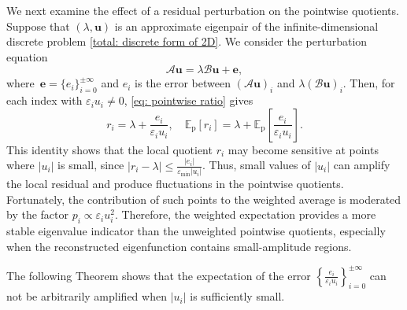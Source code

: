\documentclass[11pt]{article}
\numberwithin{equation}{section}
\begin{document}
We next examine the effect of a residual perturbation on the pointwise
quotients. Suppose that $(\lambda, \boldsymbol{u})$ is an approximate eigenpair of the infinite-dimensional discrete problem \eqref{total: discrete form of 2D}. We consider the perturbation equation
\begin{equation} \label{eq: error analysis}
\mathcal{A}\boldsymbol{u} = \lambda \mathcal{B}\boldsymbol{u} + \mathbf{e},
\end{equation}
where $\, \mathbf{e} = \{e_i\}_{i = 0}^{\pm \infty}$ and $e_i$ is the error between $(\mathcal{A}\boldsymbol{u})_i$ and $\lambda (\mathcal{B}\boldsymbol{u})_i$. Then, for each index with $\varepsilon_i u_i\neq0$, \eqref{eq: pointwise ratio} gives
\begin{equation} \label{eq: pointwise error term}
r_i = \lambda + \frac{e_i}{\varepsilon_i u_i},
\quad
\mathbb{E}_{\mathrm{p}}[r_i] = \lambda + \mathbb{E}_{\mathrm{p}}\left[\frac{e_i}{\varepsilon_i u_i}\right].
\end{equation}
This identity shows that the local quotient $r_i$ may become sensitive at points where $|u_i|$ is small, since $\left| r_i-\lambda \right| \leq \frac{|e_i|}{\varepsilon_{\min}|u_i|}$. Thus, small values of $|u_i|$ can amplify the local residual and produce fluctuations in the pointwise quotients. Fortunately, the contribution of such points to the weighted average is moderated by the factor $p_i\propto \varepsilon_i u_i^2$. Therefore, the weighted expectation provides a more stable eigenvalue indicator than the unweighted pointwise quotients, especially when the reconstructed eigenfunction contains small-amplitude regions.



The following Theorem shows that the expectation of the error $\left\{\frac{e_i}{\varepsilon_i u_i}\right\}_{i=0}^{\pm \infty}$ can not be arbitrarily amplified when $|u_i|$ is sufficiently small.
\end{document}
